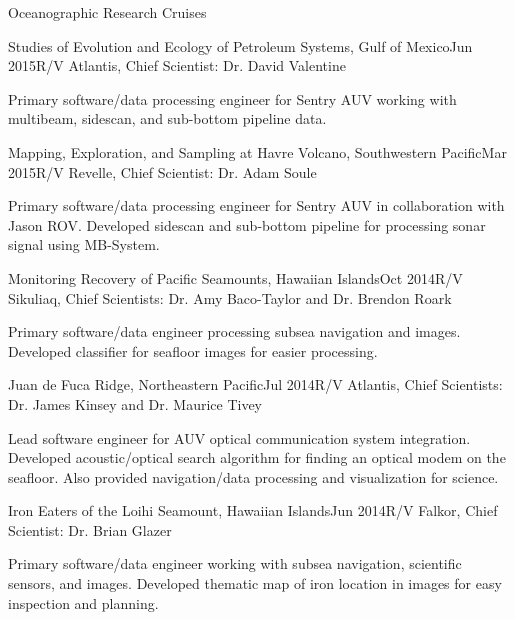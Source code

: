 \documentclass{resume} %
\begin{document}
\newpage
\begin{rSection}{Oceanographic Research Cruises}

\begin{rSubsection}{Studies of Evolution and Ecology of Petroleum Systems, Gulf of Mexico}{Jun 2015}{R/V Atlantis, Chief Scientist: Dr. David Valentine}{}
\item{Primary software/data processing engineer for Sentry AUV working with multibeam, sidescan, and sub-bottom pipeline data.}
\end{rSubsection}

\begin{rSubsection}{Mapping, Exploration, and Sampling at Havre Volcano, Southwestern Pacific}{Mar 2015}{R/V Revelle, Chief Scientist: Dr. Adam Soule}{}
\item{Primary software/data processing engineer for Sentry AUV in collaboration with Jason ROV. Developed sidescan and sub-bottom pipeline for processing sonar signal using MB-System.}
\end{rSubsection}

\begin{rSubsection}{Monitoring Recovery of Pacific Seamounts, Hawaiian Islands}{Oct 2014}{R/V Sikuliaq, Chief Scientists: Dr. Amy Baco-Taylor and Dr. Brendon Roark}{}
\item{Primary software/data engineer processing subsea navigation and images. Developed classifier for seafloor images for easier processing.}
\end{rSubsection}

\begin{rSubsection}{Juan de Fuca Ridge, Northeastern Pacific}{Jul 2014}{R/V Atlantis, Chief Scientists: Dr. James Kinsey and Dr. Maurice Tivey}{}
\item{Lead software engineer for AUV optical communication system integration. Developed acoustic/optical search algorithm for finding an optical modem on the seafloor. Also provided navigation/data processing and visualization for science.}
\end{rSubsection}

\begin{rSubsection}{Iron Eaters of the Loihi Seamount, Hawaiian Islands}{Jun 2014}{R/V Falkor, Chief Scientist: Dr. Brian Glazer}{}
\item{Primary software/data engineer working with subsea navigation, scientific sensors, and images. Developed thematic map of iron location in images for easy inspection and planning. }
\end{rSubsection}


\end{rSection}
\end{document}
